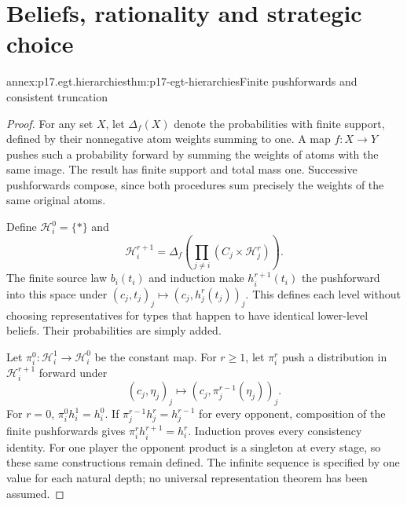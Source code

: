 \section{Beliefs, rationality and strategic choice}
\label{sec:annex-p17-epistemic-game-theory}

\begin{annexitem}{annex:p17.egt.hierarchies}{thm:p17-egt-hierarchies}{Finite pushforwards and consistent truncation}
\begin{proof}
For any set \(X\), let \(\Delta_f(X)\) denote the probabilities
with finite support, defined by their nonnegative atom weights
summing to one. A map \(f:X\to Y\) pushes such a probability
forward by summing the weights of atoms with the same image.
The result has finite support and total mass one. Successive
pushforwards compose, since both procedures sum precisely the
weights of the same original atoms.

Define \(\mathcal H_i^0=\{*\}\) and
\[
 \mathcal H_i^{r+1}
   =\Delta_f\!\left(\prod_{j\ne i}(C_j\times\mathcal H_j^r)\right).
\]
The finite source law \(b_i(t_i)\) and induction make
\(h_i^{r+1}(t_i)\) the pushforward into this space under
\((c_j,t_j)_j\mapsto(c_j,h_j^r(t_j))_j\).
This defines each level without choosing representatives for
types that happen to have identical lower-level beliefs.
Their probabilities are simply added.

Let \(\pi_i^0:\mathcal H_i^1\to\mathcal H_i^0\) be the constant
map. For \(r\geq1\), let \(\pi_i^r\) push a distribution in
\(\mathcal H_i^{r+1}\) forward under
\[
 (c_j,\eta_j)_j\longmapsto(c_j,\pi_j^{r-1}(\eta_j))_j.
\]
For \(r=0\), \(\pi_i^0h_i^1=h_i^0\).
If \(\pi_j^{r-1}h_j^r=h_j^{r-1}\) for every opponent,
composition of the finite pushforwards gives
\(\pi_i^rh_i^{r+1}=h_i^r\).
Induction proves every consistency identity.
For one player the opponent product is a singleton at every
stage, so these same constructions remain defined.
The infinite sequence is specified by one value for each natural
depth; no universal representation theorem has been assumed.
\end{proof}
\end{annexitem}

